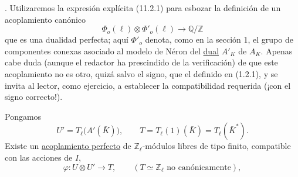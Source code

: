\par\medskip
{}. Utilizaremos la expresión explícita (11.2.1) para esbozar la
definición de un acoplamiento canónico
\begin{equation}\tag{11.3.1}
\Phi_o(\ell)\otimes\Phi'_o(\ell)\longrightarrow\mathbb Q/\mathbb Z
\end{equation}
que es una dualidad perfecta; aquí $\Phi'_o$ denota, como en la sección
1, el grupo de componentes conexas asociado al modelo de Néron del
\underline{dual} $A'_K$ de $A_K$. Apenas cabe duda (aunque el redactor
ha prescindido de la verificación) de que este acoplamiento no es otro,
quizá salvo el signo, que el definido en (1.2.1), y se invita al lector,
como ejercicio, a establecer la compatibilidad requerida (¡con el
signo correcto!).

Pongamos
\begin{equation*}
U'=T_\ell\bigl(A'(\bar K)\bigr),
 \qquad
T=T_\ell(1)(\bar K)=T_\ell(\bar K^*).
\end{equation*}
Existe un \underline{acoplamiento perfecto} de
$\mathbb Z_\ell$-módulos libres de tipo finito, compatible con las
acciones de $I$,
\begin{equation}\tag{11.3.2}
\varphi:U\otimes U'\longrightarrow T,
 \qquad (T\simeq\mathbb Z_\ell\text{ no canónicamente}),
\end{equation}


